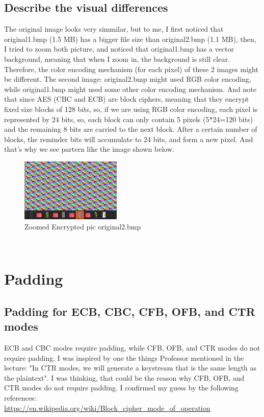 \documentclass{article}
\begin{document}
\subsection{Describe the visual differences}
The original image looks very simmilar, but to me, I first noticed that original1.bmp (1.5 MB) has a bigger file size
than original2.bmp (1.1 MB), then, I tried to zoom both picture, and noticed that original1.bmp has a vector background,
meaning that when I zoom in, the background is still clear.\\
Therefore, the color encoding mechanism (for each pixel) of these 2 images might be different. The second image:
original2.bmp might used RGB color encoding, while original1.bmp might used some other color encoding mechanism.
And note that since AES (CBC and ECB) are block ciphers, meaning that they encrypt fixed size blocks of 128 bits,
so, if we are using RGB color encoding, each pixel is represented by 24 bits, so, each block can only contain
5 pixels (5*24=120 bits) and the remaining 8 bits are carried to the next block. After a certain number of blocks,
the reminder bits will accumulate to 24 bits, and form a new pixel. And that's why we see partern like the image
shown below.
\begin{figure}[h]
    \centering
    \includegraphics[height=3cm]{images/slash_pattern.png}
    \caption{Zoomed Encrypted pic original2.bmp}
\end{figure}\\
\section{Padding}
\subsection{Padding for ECB, CBC, CFB, OFB, and CTR modes}
ECB and CBC modes require padding, while CFB, OFB, and CTR modes do not require padding. I was inspired by one the things
Professor mentioned in the lecture: "In CTR modes, we will generate a keystream that is the same length as the plaintext".
I was thinking, that could be the reason why CFB, OFB, and CTR modes do not require padding. I confirmed my guess by
the following references:\\
\url{https://en.wikipedia.org/wiki/Block_cipher_mode_of_operation}\\
\end{document}

